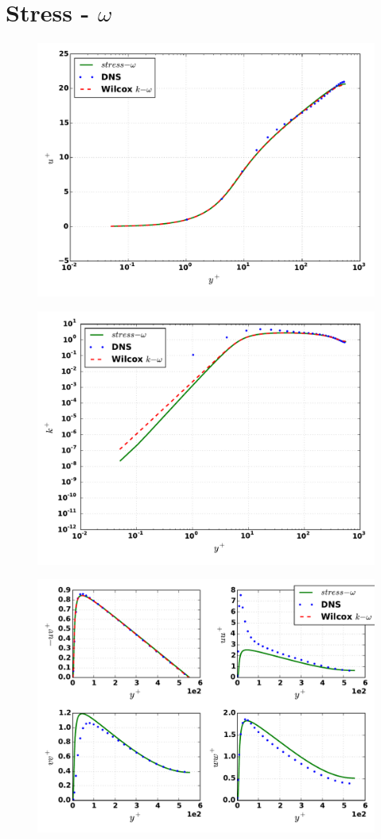 \documentclass[%
notitlepage,
]{revtex4-1}
\begin{document}
\section{Stress - $\omega$}
\begin{figure}[!h]		
\includegraphics[width=0.8\linewidth]{figs/stress_omega/Re550/stress_omega_u.pdf}
\end{figure}
\begin{figure}[!h]		
\includegraphics[width=0.8\linewidth]{figs/stress_omega/Re550/stress_omega_k.pdf}
\end{figure}
\begin{figure}[!h]		
\includegraphics[width=0.8\linewidth]{figs/stress_omega/Re550/stress_omega_reystress.pdf}
\end{figure}
\appendix
\end{document}
